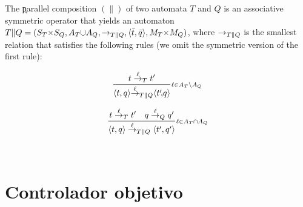 \begin{definition}  \label{def:parcomp}
	The \k{parallel composition} $(\|)$ of two automata $T$ and $Q$ is an associative 
	symmetric operator that yields an automaton $T \| Q = (S_T {\times} S_Q, A_T {\cup} 
	A_Q, \rightarrow_{T\|Q}, \langle\bar{t},\bar{q}\rangle, M_T {\times} M_Q)$, where $\rightarrow_{T\|Q}$ is the 
	smallest relation that satisfies the following rules (we omit the symmetric version of 
	the first rule):
	
	\begin{normalsize}
		\centering
		\vspace{-18pt}
		\hspace{-50pt}
		\begin{minipage}{0.30\linewidth}
			\[ 
			\frac{t \overset{\ell}{\rightarrow}_{T} t'}{\langle t,q\rangle {\overset{\ell}{\rightarrow}_{T\|Q}} \langle t'\!,\!q\rangle }{{\scriptstyle \ell \in A_{T} {\setminus} A_{Q}}} 
			\]
		\end{minipage} 
		\hspace{40pt}
		\begin{minipage}{0.30\linewidth}
			\[ 
			\frac{t \overset{\ell}{\rightarrow}_{T} t' \quad q \overset{\ell}{\rightarrow}_{Q} q'}{\langle t,q\rangle \overset{\ell}{\rightarrow}_{T\|Q} \langle t',q'\rangle}{{\scriptstyle \ell \in A_{T} {\cap} A_{Q}}}
			\]
		\end{minipage} \\[15pt]
	\end{normalsize}
\end{definition}

\section{Controlador objetivo}

